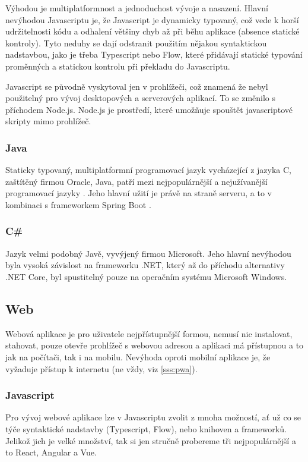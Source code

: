 Výhodou je multiplatformnost a jednoduchost vývoje a nasazení. Hlavní nevýhodou Javascriptu je, že Javascript je dynamicky typovaný, což vede k horší udržitelnosti kódu a odhalení většiny chyb až při běhu aplikace (absence statické kontroly). Tyto neduhy se dají odstranit použitím nějakou syntaktickou nadstavbou, jako je třeba Typescript nebo Flow, které přidávají statické typování proměnných a statickou kontrolu při překladu do Javascriptu.

Javascript se původně vyskytoval jen v prohlížeči, což znamená že nebyl použitelný pro vývoj desktopových a serverových aplikací. To se změnilo s příchodem Node.js. Node.js je prostředí, které umožňuje spouštět javascriptové skripty mimo prohlížeč.

\subsubsection*{Java}
Staticky typovaný, multiplatformní programovací jazyk vycházející z jazyka C, zaštítěný firmou Oracle, Java, patří mezi nejpopulárnější a nejužívanější programovací jazyky \cite{stackexchangeinc_2019_stack} . Jeho hlavní užití je právě na straně serveru, a to v kombinaci s frameworkem Spring Boot \cite{jetbrainssro_2019_demographics} .

\subsubsection*{C\# }
Jazyk velmi podobný Javě, vyvýjený firmou Microsoft. Jeho hlavní nevýhodou byla vysoká závislost na frameworku .NET, který až do příchodu alternativy .NET Core, byl spustitelný pouze na operačním systému Microsoft Windows.

\subsection{Web}
\label{ss:web}
Webová aplikace je pro uživatele nejpřístupnější formou, nemusí nic instalovat, stahovat, pouze otevře prohlížeč s webovou adresou a aplikaci má přístupnou a to jak na počítači, tak i na mobilu. Nevýhoda oproti mobilní aplikace je, že vyžaduje přístup k internetu (ne vždy, viz \ref{sss:pwa}).

\subsubsection*{Javascript}
\label{ss:javascript}
Pro vývoj webové aplikace lze v Javascriptu zvolit z mnoha možností, ať už co se týče syntaktické nadstavby (Typescript, Flow), nebo knihoven a frameworků. Jelikož jich je velké množství, tak si jen stručně probereme tři nejpopulárnější a to React, Angular a Vue.

